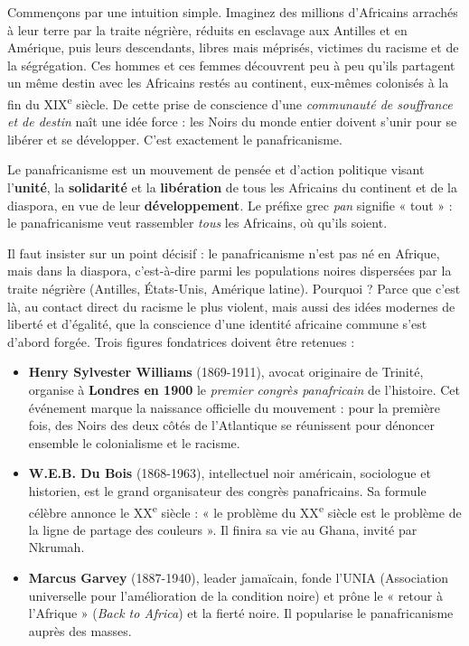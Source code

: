 \documentclass[11pt]{article}
\newcommand{\cle}[1]{{\popxbold\color{popdark}#1}}
\newcounter{popsec}
\newcounter{popsub}
\newcommand{\courssub}[1]{%
  \stepcounter{popsub}%
  \par\vspace{9pt}\noindent{\popxbold\fontsize{11.5}{13}\selectfont\color{popink}{\color{poporange}\thepopsec.\thepopsub}\hspace{6pt}#1}\par\nopagebreak\vspace{4pt}
}
\begin{document}
\courssub{Les origines : un mouvement né dans la diaspora}

Commençons par une intuition simple. Imaginez des millions d'Africains arrachés à leur terre par la traite négrière, réduits en esclavage aux Antilles et en Amérique, puis leurs descendants, libres mais méprisés, victimes du racisme et de la ségrégation. Ces hommes et ces femmes découvrent peu à peu qu'ils partagent un même destin avec les Africains restés au continent, eux-mêmes colonisés à la fin du XIX\textsuperscript{e} siècle. De cette prise de conscience d'une \emph{communauté de souffrance et de destin} naît une idée force : les Noirs du monde entier doivent s'unir pour se libérer et se développer. C'est exactement le panafricanisme.

\begin{definition}[Le panafricanisme]
Le \cle{panafricanisme} est un mouvement de pensée et d'action politique visant l'\textbf{unité}, la \textbf{solidarité} et la \textbf{libération} de tous les Africains du continent et de la diaspora, en vue de leur \textbf{développement}. Le préfixe grec \emph{pan} signifie « tout » : le panafricanisme veut rassembler \emph{tous} les Africains, où qu'ils soient.
\end{definition}

Il faut insister sur un point décisif : le panafricanisme n'est pas né en Afrique, mais dans la \cle{diaspora}, c'est-à-dire parmi les populations noires dispersées par la traite négrière (Antilles, États-Unis, Amérique latine). Pourquoi ? Parce que c'est là, au contact direct du racisme le plus violent, mais aussi des idées modernes de liberté et d'égalité, que la conscience d'une identité africaine commune s'est d'abord forgée. Trois figures fondatrices doivent être retenues :

\begin{itemize}
\item \textbf{Henry Sylvester Williams} (1869-1911), avocat originaire de Trinité, organise à \textbf{Londres en 1900} le \emph{premier congrès panafricain} de l'histoire. Cet événement marque la naissance officielle du mouvement : pour la première fois, des Noirs des deux côtés de l'Atlantique se réunissent pour dénoncer ensemble le colonialisme et le racisme.
\item \textbf{W.E.B. Du Bois} (1868-1963), intellectuel noir américain, sociologue et historien, est le grand organisateur des congrès panafricains. Sa formule célèbre annonce le XX\textsuperscript{e} siècle : « le problème du XX\textsuperscript{e} siècle est le problème de la ligne de partage des couleurs ». Il finira sa vie au Ghana, invité par Nkrumah.
\item \textbf{Marcus Garvey} (1887-1940), leader jamaïcain, fonde l'UNIA (Association universelle pour l'amélioration de la condition noire) et prône le « retour à l'Afrique » (\emph{Back to Africa}) et la fierté noire. Il popularise le panafricanisme auprès des masses.
\end{itemize}
\end{document}
